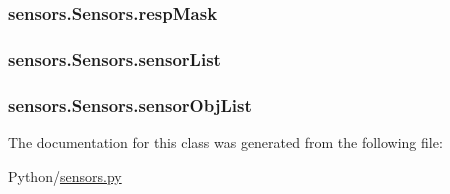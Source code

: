 \subsubsection[{\texorpdfstring{resp\+Mask}{respMask}}]{\setlength{\rightskip}{0pt plus 5cm}sensors.\+Sensors.\+resp\+Mask}\hypertarget{classsensors_1_1Sensors_a13c3cb41e69dda2183c99a11a6cc69d5}{}\label{classsensors_1_1Sensors_a13c3cb41e69dda2183c99a11a6cc69d5}
\subsubsection[{\texorpdfstring{sensor\+List}{sensorList}}]{\setlength{\rightskip}{0pt plus 5cm}sensors.\+Sensors.\+sensor\+List}\hypertarget{classsensors_1_1Sensors_a70cd97f59cdb39f1f02260551d7e5ea5}{}\label{classsensors_1_1Sensors_a70cd97f59cdb39f1f02260551d7e5ea5}
\subsubsection[{\texorpdfstring{sensor\+Obj\+List}{sensorObjList}}]{\setlength{\rightskip}{0pt plus 5cm}sensors.\+Sensors.\+sensor\+Obj\+List}\hypertarget{classsensors_1_1Sensors_a753ac6bef7233285cbf9651d5f5a5b7d}{}\label{classsensors_1_1Sensors_a753ac6bef7233285cbf9651d5f5a5b7d}


The documentation for this class was generated from the following file\+:\begin{DoxyCompactItemize}
\item 
Python/\hyperlink{sensors_8py}{sensors.\+py}\end{DoxyCompactItemize}
